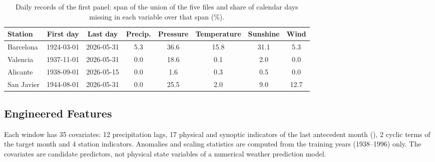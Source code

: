 \documentclass[11pt,a4paper]{article}
\begin{document}
\begin{table}[htbp]
\centering
\caption{Daily records of the first panel: span of the union of the five files and share of calendar days missing in each variable over that span (\%).}
\label{tab:etl}
{\small
\begin{tabular}{lccccccc}
\toprule
\textbf{Station} & \textbf{First day} & \textbf{Last day} & \textbf{Precip.} & \textbf{Pressure} & \textbf{Temperature} & \textbf{Sunshine} & \textbf{Wind} \\
\midrule
Barcelona & 1924-03-01 & 2026-05-31 & 5.3 & 36.6 & 15.8 & 31.1 & 5.3 \\
Valencia & 1937-11-01 & 2026-05-31 & 0.0 & 18.6 & 0.1 & 2.0 & 0.0 \\
Alicante & 1938-09-01 & 2026-05-15 & 0.0 & 1.6 & 0.3 & 0.5 & 0.0 \\
San Javier & 1944-08-01 & 2026-05-31 & 0.0 & 25.5 & 2.0 & 9.0 & 12.7 \\
\bottomrule
\end{tabular}}
\end{table}

\subsection{Engineered Features}
\label{sec:glossary}

Each window has 35 covariates: 12 precipitation lags, 17 physical and synoptic indicators of the last antecedent month (), 2 cyclic terms of the target month and 4 station indicators. Anomalies and scaling statistics are computed from the training years (1938--1996) only. The covariates are candidate predictors, not physical state variables of a numerical weather prediction model.
\end{document}
